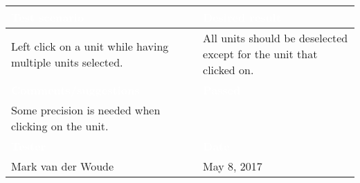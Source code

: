 \begin{tabularx}{\textwidth}{|X|X|}
\hline
\rowcolor{lightgray}\textcolor{white}{\textbf{Test scenario}} &
\textcolor{white}{\textbf{Desired result}}       
\\\hline
Left click on a unit while having multiple units selected. & All units should be deselected except for the unit that clicked on.  
\\\hline
\rowcolor{lightgray}\textcolor{white}{\textbf{Comments/suggestions}} & 
\textcolor{white}{\textbf{Passed}}
\\\hline
Some precision is needed when clicking on the unit. & \cellcolor{green}                      
\\\hline
\rowcolor{lightgray}\textcolor{white}{\textbf{Tester}} & 
\textcolor{white}{\textbf{Date}}               
\\\hline
Mark van der Woude & May 8, 2017                               		 
\\\hline
\end{tabularx}